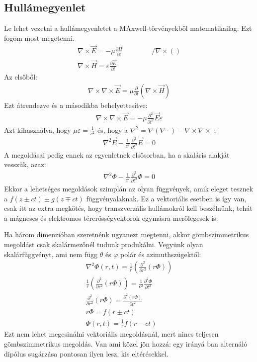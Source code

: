 \documentclass{article}
\begin{document}
\subsection{Hullámegyenlet}
Le lehet vezetni a hullámegyenletet a MAxwell-törvényekből matematikailag. Ezt fogom most megetenni.
\begin{gather*}
\nabla \times \vec{E} = -\mu \frac{\partial \vec{H}}{\partial t} \hspace{50pt} / \nabla \times () \\
\nabla \times \vec{H} = \varepsilon \frac{\partial \vec{E}}{\partial t}
\end{gather*}
Az elsőből:
\begin{gather*}
\nabla \times \nabla \times \vec{E} = \mu \frac{\partial}{\partial t} (\nabla \times \vec{H})
\end{gather*}
Ezt átrendezve és a másodikba behelyettesítve:
\begin{gather*}
\nabla \times \nabla \times \vec{E} = -\mu  \frac{\partial^2}{\partial t^2} \vec{E} \varepsilon
\end{gather*}
Azt kihasználva, hogy $\mu \varepsilon = \frac{1}{c^2}$ és, hogy a $\nabla ^2 = \nabla(\nabla \cdot) - \nabla \times \nabla \times$ :
\begin{gather*}
\boxed{
\nabla^2 \vec{E} - \frac{1}{c^2} \frac{\partial^2}{\partial t^2} \vec{E} = 0}
\end{gather*}
A megoldásai pedig ennek az egyenletnek elsősorban, ha a skaláris alakját vesszük, azaz:
\begin{gather*}
\nabla^2 \Phi - \frac{1}{c^2} \frac{\partial^2}{\partial t^2} \Phi = 0
\end{gather*}
Ekkor a lehetséges megoldások szimplán az olyan függvények, amik eleget tesznek a $f(z \pm ct) \pm g(z \mp ct)$ függvényalaknak. Ez a vektoriális esetben is így van, csak itt az extra megkötés, hogy transzverzális hullámokról kell beszélnünk, tehát a mágneses és elektromos térerősségvektorok egymásra merőlegesek is.

Ha három dimenzióban szeretnénk ugyanezt megtenni, akkor gömbszimmetrikus megoldást csak skalármezőnél tudunk produkálni. Vegyünk olyan skalárfüggvényt, ami nem függ $\theta$ és $\varphi$ polár és azimuthszügektől:
\begin{gather*}
\nabla^2 \Phi(r, t) = \frac{1}{r} \left( \frac{\partial ^2}{\partial r^2} (r\Phi)\right)\\
\frac{1}{r} \left( \frac{\partial^2}{\partial r^2} (r\Phi) \right) = \frac{1}{c^2} \frac{\partial^2 \Phi}{\partial t^2} \\
\frac{\partial^2}{\partial r^2} (r\Phi) = \frac{\partial^2(r\Phi)}{\partial t^2} \\
r\Phi = f(r \pm ct) \\
\Phi(r,t) = \frac{1}{r} f(r-ct)
\end{gather*}
Ezt nem lehet megcsinálni vektoriális megoldásnál, mert nincs teljesen gömbszimmetrikus megoldás. Van ami közel jön hozzá: egy irányá ban alternáló dipólus sugárzása pontosan ilyen lesz, kis eltérésekkel. 
\end{document}
